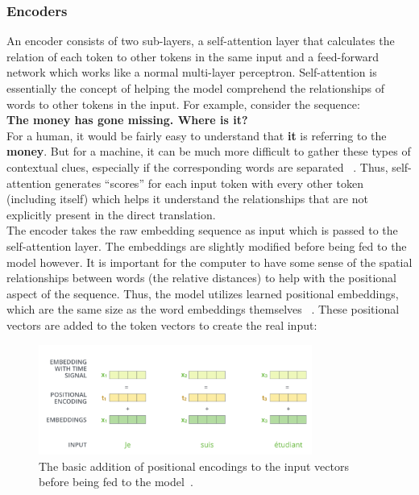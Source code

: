 \subsubsection{Encoders}
An encoder consists of two sub-layers, a self-attention layer that calculates the relation of each token to other tokens in the same input and a feed-forward network which works like a normal multi-layer perceptron. Self-attention is essentially the concept of helping the model comprehend the relationships of words to other tokens in the input. For example, consider the sequence: \\

\textbf{The money has gone missing. Where is it?} \\

For a human, it would be fairly easy to understand that \textbf{it} is referring to the \textbf{money}. But for a machine, it can be much more difficult to gather these types of contextual clues, especially if the corresponding words are separated ~\parencite{hochreiter1997long}. Thus, self-attention generates “scores” for each input token with every other token (including itself) which helps it understand the relationships that are not explicitly present in the direct translation. \\

The encoder takes the raw embedding sequence as input which is passed to the self-attention layer. The embeddings are slightly modified before being fed to the model however. It is important for the computer to have some sense of the spatial relationships between words (the relative distances) to help with the positional aspect of the sequence. Thus, the model utilizes learned positional embeddings, which are the same size as the word embeddings themselves ~\parencite{devlin2019bert:}. These positional vectors are added to the token vectors to create the real input:

\begin{figure}[h]
\centering
\includegraphics[width=0.8\textwidth]{fig/positional_encodings.png}
\caption{The basic addition of positional encodings to the input vectors before being fed to the model~\parencite{alammar_2018}.
}
\label{fig:positional_encodings}
\end{figure}

